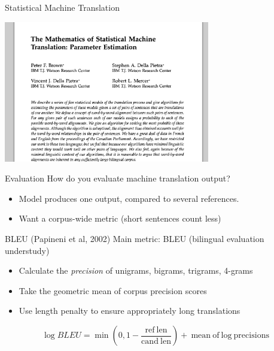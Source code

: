 \documentclass{beamer}
\begin{document}
\begin{frame}{Statistical Machine Translation}
  \begin{center}
    \includegraphics[width=9cm]{mathofmt}
  \end{center}
\end{frame}


{

}

\begin{frame}{Evaluation}
  How do you evaluate machine translation output?
  
  \begin{itemize}
  \item Model produces one output, compared to several references.
    \air
  \item Want a corpus-wide metric (short sentences count less)
  \end{itemize}

\end{frame}

\begin{frame}{BLEU (Papineni et al, 2002)}
    Main metric: BLEU (bilingual evaluation understudy)

  \begin{itemize}
  \item Calculate the \textit{precision} of unigrams, bigrams, trigrams, 4-grams
    \air 
  \item Take the geometric mean of corpus precision scores
    \air 
  \item Use length penalty to ensure appropriately long translations 
  \end{itemize}

  \[ \log BLEU = \min(0, 1 - \frac{\mathrm{ref\ len}}{\mathrm{cand\ len}}) + \mathrm{\ mean \ of \ log \ precisions} \] 

\end{frame}
\end{document}
